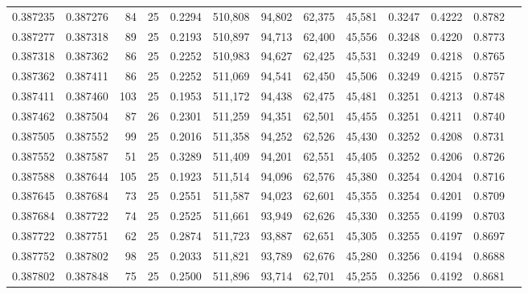 \begin{tabular}{rrrrrrrrrrrrr}
0.387235 & 0.387276 &    84 &  25 &                                     0.2294 & 510,808 &  94,802 &  62,375 &  45,581 & 0.3247 & 0.4222 & 0.8782 \\
0.387277 & 0.387318 &    89 &  25 &                                     0.2193 & 510,897 &  94,713 &  62,400 &  45,556 & 0.3248 & 0.4220 & 0.8773 \\
0.387318 & 0.387362 &    86 &  25 &                                     0.2252 & 510,983 &  94,627 &  62,425 &  45,531 & 0.3249 & 0.4218 & 0.8765 \\
0.387362 & 0.387411 &    86 &  25 &                                     0.2252 & 511,069 &  94,541 &  62,450 &  45,506 & 0.3249 & 0.4215 & 0.8757 \\
0.387411 & 0.387460 &   103 &  25 &                                     0.1953 & 511,172 &  94,438 &  62,475 &  45,481 & 0.3251 & 0.4213 & 0.8748 \\
0.387462 & 0.387504 &    87 &  26 &                                     0.2301 & 511,259 &  94,351 &  62,501 &  45,455 & 0.3251 & 0.4211 & 0.8740 \\
0.387505 & 0.387552 &    99 &  25 &                                     0.2016 & 511,358 &  94,252 &  62,526 &  45,430 & 0.3252 & 0.4208 & 0.8731 \\
0.387552 & 0.387587 &    51 &  25 &                                     0.3289 & 511,409 &  94,201 &  62,551 &  45,405 & 0.3252 & 0.4206 & 0.8726 \\
0.387588 & 0.387644 &   105 &  25 &                                     0.1923 & 511,514 &  94,096 &  62,576 &  45,380 & 0.3254 & 0.4204 & 0.8716 \\
0.387645 & 0.387684 &    73 &  25 &                                     0.2551 & 511,587 &  94,023 &  62,601 &  45,355 & 0.3254 & 0.4201 & 0.8709 \\
0.387684 & 0.387722 &    74 &  25 &                                     0.2525 & 511,661 &  93,949 &  62,626 &  45,330 & 0.3255 & 0.4199 & 0.8703 \\
0.387722 & 0.387751 &    62 &  25 &                                     0.2874 & 511,723 &  93,887 &  62,651 &  45,305 & 0.3255 & 0.4197 & 0.8697 \\
0.387752 & 0.387802 &    98 &  25 &                                     0.2033 & 511,821 &  93,789 &  62,676 &  45,280 & 0.3256 & 0.4194 & 0.8688 \\
0.387802 & 0.387848 &    75 &  25 &                                     0.2500 & 511,896 &  93,714 &  62,701 &  45,255 & 0.3256 & 0.4192 & 0.8681 \\

\end{tabular}
